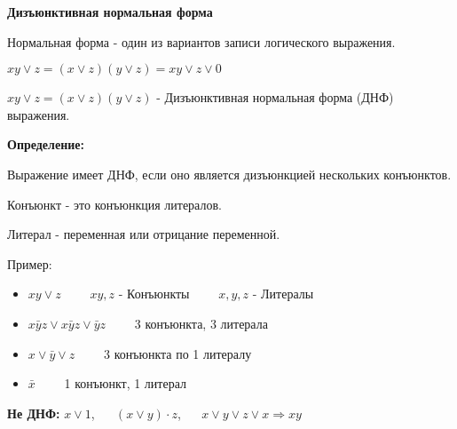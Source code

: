 \documentclass[a4paper,12pt]{article}
\begin{document}
    \begin{center}
        \textbf{Дизъюнктивная нормальная форма}
    \end{center}

    Нормальная форма - один из вариантов записи логического выражения.

    $xy\vee z=(x\vee z)(y\vee z)=xy\vee z\vee 0$

    $xy\vee z=(x\vee z)(y\vee z)$ - Дизъюнктивная нормальная форма (ДНФ) выражения.

    \textbf{Определение:}

    Выражение имеет ДНФ, если оно является дизъюнкцией нескольких конъюнктов.

    Конъюнкт - это конъюнкция литералов.

    Литерал - переменная или отрицание переменной.

    Пример:
    \begin{itemize}
        \item $xy\vee z$ $\hspace{20pt}$ $xy,z$ - Конъюнкты $\hspace{20pt}$ $x,y,z$ - Литералы

        \item $x\bar y z\vee x\bar y z\vee \bar y z$ $\hspace{20pt}$ 3 конъюнкта, 3 литерала

        \item $x\vee \bar y \vee z$ $\hspace{20pt}$ 3 конъюнкта по 1 литералу

        \item $\bar x$ $\hspace{20pt}$ 1 конъюнкт, 1 литерал
    \end{itemize}

    \textbf{Не ДНФ:} $x\vee 1$,$\hspace{20pt}$$(x\vee y)\cdot z$,$\hspace{20pt}$$x\vee y \vee z \vee x \Longrightarrow xy$
\end{document}
